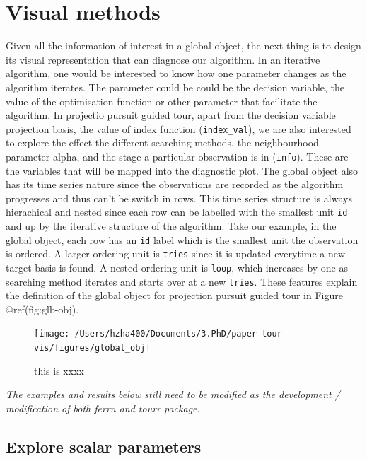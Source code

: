 \documentclass[12pt]{article}
\begin{document}
\hypertarget{visual-methods}{%
\section{Visual methods}\label{visual-methods}}

Given all the information of interest in a global object, the next thing
is to design its visual representation that can diagnose our algorithm.
In an iterative algorithm, one would be interested to know how one
parameter changes as the algorithm iterates. The parameter could be
could be the decision variable, the value of the optimisation function
or other parameter that facilitate the algorithm. In projectio pursuit
guided tour, apart from the decision variable projection basis, the
value of index function (\texttt{index\_val}), we are also interested to
explore the effect the different searching methods, the neighbourhood
parameter alpha, and the stage a particular observation is in
(\texttt{info}). These are the variables that will be mapped into the
diagnostic plot. The global object also has its time series nature since
the observations are recorded as the algorithm progresses and thus can't
be switch in rows. This time series structure is always hierachical and
nested since each row can be labelled with the smallest unit \texttt{id}
and up by the iterative structure of the algorithm. Take our example, in
the global object, each row has an \texttt{id} label which is the
smallest unit the observation is ordered. A larger ordering unit is
\texttt{tries} since it is updated everytime a new target basis is
found. A nested ordering unit is \texttt{loop}, which increases by one
as searching method iterates and starts over at a new \texttt{tries}.
These features explain the definition of the global object for
projection pursuit guided tour in Figure @ref(fig:glb-obj).

\begin{figure}
\texttt{[image: /Users/hzha400/Documents/3.PhD/paper-tour-vis/figures/global\_obj]} \caption{this is xxxx}\label{fig:glb-obj}
\end{figure}

\emph{The examples and results below still need to be modified as the
development / modification of both ferrn and tourr package}.

\hypertarget{explore-scalar-parameters}{%
\subsection{Explore scalar parameters}\label{explore-scalar-parameters}}
\end{document}
